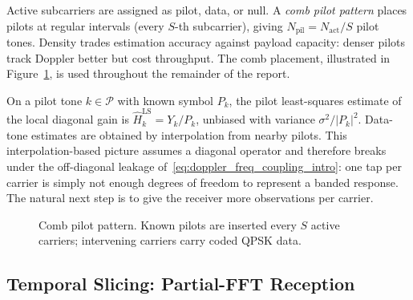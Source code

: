 \documentclass{wileysev}
\begin{document}
	Active subcarriers are assigned as pilot, data, or null. A \emph{comb pilot pattern} places pilots at regular intervals (every \(S\)-th subcarrier), giving \(N_{\mathrm{pil}}=N_{\mathrm{act}}/S\) pilot tones. Density trades estimation accuracy against payload capacity: denser pilots track Doppler better but cost throughput. The comb placement, illustrated in Figure~\ref{fig:pilot-grid}, is used throughout the remainder of the report.
	
	On a pilot tone \(k\in\mathcal{P}\) with known symbol \(P_k\), the pilot least-squares estimate of the local diagonal gain is \(\hat H_k^{\mathrm{LS}} = Y_k/P_k\), unbiased with variance \(\sigma^2/|P_k|^2\). Data-tone estimates are obtained by interpolation from nearby pilots. This interpolation-based picture assumes a diagonal operator and therefore breaks under the off-diagonal leakage of~\eqref{eq:doppler_freq_coupling_intro}: one tap per carrier is simply not enough degrees of freedom to represent a banded response. The natural next step is to give the receiver more observations per carrier.
	
	
	\begin{figure}[tbp]
		\centering
		\caption{Comb pilot pattern. Known pilots are inserted every $S$ active carriers; intervening carriers carry coded QPSK data.}
		\label{fig:pilot-grid}
	\end{figure}
	
	
	\subsection{Temporal Slicing: Partial-FFT Reception}
	\label{ssec:partial-fft}
	
\end{document}
